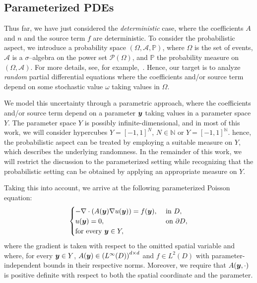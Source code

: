 \subsection{Parameterized PDEs}\label{subsec:paramterized-pdes}
Thus far, we have just considered the \emph{deterministic} case, where the coefficients $A$ and $n$ and the source term $f$ are deterministic.
To consider the probabilistic aspect, we introduce a probability space $(\Omega, \mathcal{A}, \mathbb{P})$, where $\Omega$ is the set of events, $\mathcal{A}$ is a $\sigma$--algebra on the power set $\mathscr{P}(\Omega)$, and $\mathbb{P}$ the probability measure on $(\Omega,\mathcal{A})$.
For more details, see, for example,~\cite[Chapter~2]{sullivan2015}.
Hence, our target is to analyze \emph{random} partial differential equations where the coefficients and/or source term depend on some stochastic value $\omega$ taking values in $\Omega$.

We model this uncertainty through a parametric approach, where the coefficients and/or source term depend on a parameter ${\bm{y}}$ taking values in a parameter space $Y$.
The parameter space $Y$ is possibly infinite-dimensional, and in most of this work, we will consider hypercubes $Y=[-1,1]^{N}$, $N\in\mathbb{N}$ or $Y=[-1,1]^\mathbb{N}$.
hence, the probabilistic aspect can be treated by employing a suitable measure on $Y$, which describes the underlying randomness.
In the remainder of this work, we will restrict the discussion to the parameterized setting while recognizing that the probabilistic setting can be obtained by applying an appropriate measure on $Y$.

Taking this into account, we arrive at the following parameterized Poisson equation:
\begin{equation}
    \begin{cases}
        -\nabla  \cdot \left( A({\bm{y}}) \nabla u({\bm{y}}) \right) = f({\bm{y}}),&\text{ in } D,\\
        u({\bm{y}})=0, & \text{ on }\partial D,\\
        \text{for every }{\bm{y}}\in Y,
    \end{cases}\label{eq:parameterized_poisson_pde}
\end{equation}
where the gradient is taken with respect to the omitted spatial variable and where, for every ${\bm{y}} \in Y$, $A({\bm{y}}) \in \left(L^\infty(D)\right)^{d\times d}$ and $f\in L^2(D)$ with parameter-independent bounds in their respective norms.
Moreover, we require that $A({\bm{y}}, \cdot)$ is positive definite with respect to both the spatial coordinate and the parameter.

